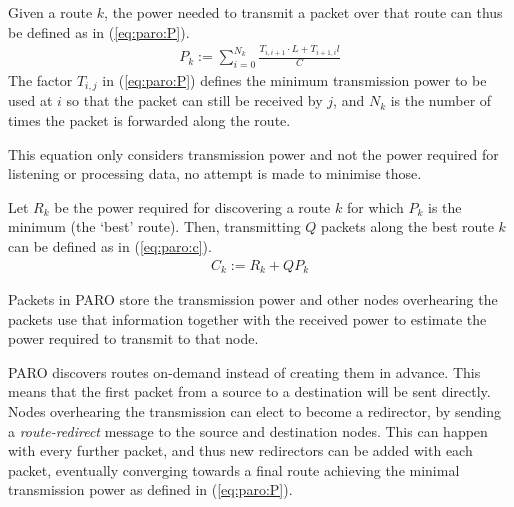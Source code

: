 Given a route $k$, the power needed to transmit a packet over that
route can thus be defined as in (\ref{eq:paro:P}).
\begin{align}\label{eq:paro:P}
  P_{k} := \sum_{i=0}^{N_{k}} \frac{T_{i,i+1} \cdot L + T_{i+1,i} l}{C}
\end{align}
The factor $T_{i,j}$ in (\ref{eq:paro:P}) defines the minimum transmission power
to be used at $i$ so that the packet can still be received by $j$, and $N_{k}$
is the number of times the packet is forwarded along the route.

This equation only considers transmission power and not the power required for
listening or processing data, no attempt is made to minimise those.

Let $R_{k}$ be the power required for discovering a route $k$ for which $P_{k}$
is the minimum (the `best' route). Then, transmitting $Q$ packets along the best route $k$ can be
defined as in (\ref{eq:paro:c}).
\begin{align}\label{eq:paro:c}
  C_{k} := R_{k} + Q P_{k}
\end{align}


Packets in PARO store the transmission power and other nodes overhearing the
packets use that information together with the received power to estimate the
power required to transmit to that node.

PARO discovers routes on-demand instead of creating them in advance. This means
that the first packet from a source to a destination will be sent directly. Nodes
overhearing the transmission can elect to become a redirector, by sending a
\textit{route-redirect} message to the source and destination nodes. This can
happen with every further packet, and thus new redirectors can be added with
each packet, eventually converging towards a final route achieving the minimal
transmission power as defined in (\ref{eq:paro:P}).
